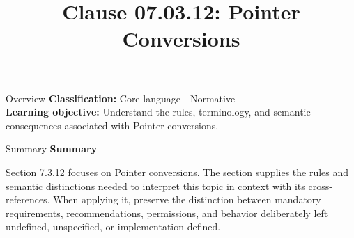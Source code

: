 \documentclass[10pt,letterpaper]{article}
\title{Clause 07.03.12: Pointer Conversions}
\author{}
\date{}
\begin{document}
\maketitle
\begin{CornellOverviewBox}{Overview}
\textbf{Classification:} Core language - Normative\\[2pt]
\textbf{Learning objective:} Understand the rules, terminology, and semantic consequences associated with Pointer conversions.
\end{CornellOverviewBox}\begin{CornellSummaryBox}{Summary}
{\sffamily\bfseries\color{Accent} Summary}\par\vspace{3pt}Section 7.3.12 focuses on Pointer conversions. The section supplies the rules and semantic distinctions needed to interpret this topic in context with its cross-references. When applying it, preserve the distinction between mandatory requirements, recommendations, permissions, and behavior deliberately left undefined, unspecified, or implementation-defined.
\end{CornellSummaryBox}
\end{document}

